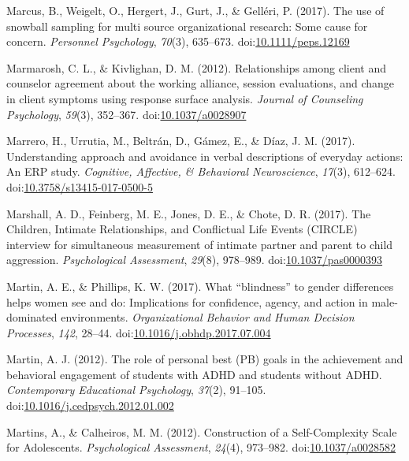 \documentclass[english,man]{apa6}
\theoremstyle{definition}
\theoremstyle{definition}
\theoremstyle{definition}
\theoremstyle{remark}
\begin{document}
\hypertarget{ref-Marcus2017}{}
Marcus, B., Weigelt, O., Hergert, J., Gurt, J., \& Gelléri, P. (2017).
The use of snowball sampling for multi source organizational research:
Some cause for concern. \emph{Personnel Psychology}, \emph{70}(3),
635--673.
doi:\href{https://doi.org/10.1111/peps.12169}{10.1111/peps.12169}

\hypertarget{ref-Marmarosh2012}{}
Marmarosh, C. L., \& Kivlighan, D. M. (2012). Relationships among client
and counselor agreement about the working alliance, session evaluations,
and change in client symptoms using response surface analysis.
\emph{Journal of Counseling Psychology}, \emph{59}(3), 352--367.
doi:\href{https://doi.org/10.1037/a0028907}{10.1037/a0028907}

\hypertarget{ref-Marrero2017}{}
Marrero, H., Urrutia, M., Beltrán, D., Gámez, E., \& Díaz, J. M. (2017).
Understanding approach and avoidance in verbal descriptions of everyday
actions: An ERP study. \emph{Cognitive, Affective, \& Behavioral
Neuroscience}, \emph{17}(3), 612--624.
doi:\href{https://doi.org/10.3758/s13415-017-0500-5}{10.3758/s13415-017-0500-5}

\hypertarget{ref-Marshall2017}{}
Marshall, A. D., Feinberg, M. E., Jones, D. E., \& Chote, D. R. (2017).
The Children, Intimate Relationships, and Conflictual Life Events
(CIRCLE) interview for simultaneous measurement of intimate partner and
parent to child aggression. \emph{Psychological Assessment},
\emph{29}(8), 978--989.
doi:\href{https://doi.org/10.1037/pas0000393}{10.1037/pas0000393}

\hypertarget{ref-Martin2017}{}
Martin, A. E., \& Phillips, K. W. (2017). What ``blindness'' to gender
differences helps women see and do: Implications for confidence, agency,
and action in male-dominated environments. \emph{Organizational Behavior
and Human Decision Processes}, \emph{142}, 28--44.
doi:\href{https://doi.org/10.1016/j.obhdp.2017.07.004}{10.1016/j.obhdp.2017.07.004}

\hypertarget{ref-Martin2012}{}
Martin, A. J. (2012). The role of personal best (PB) goals in the
achievement and behavioral engagement of students with ADHD and students
without ADHD. \emph{Contemporary Educational Psychology}, \emph{37}(2),
91--105.
doi:\href{https://doi.org/10.1016/j.cedpsych.2012.01.002}{10.1016/j.cedpsych.2012.01.002}

\hypertarget{ref-Martins2012}{}
Martins, A., \& Calheiros, M. M. (2012). Construction of a
Self-Complexity Scale for Adolescents. \emph{Psychological Assessment},
\emph{24}(4), 973--982.
doi:\href{https://doi.org/10.1037/a0028582}{10.1037/a0028582}
\end{document}
